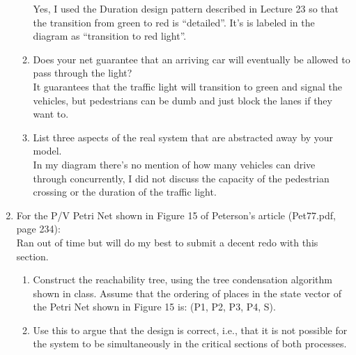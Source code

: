\documentclass{article}
\begin{document}
\begin{enumerate}
\begin{enumerate}
       Yes, I used the Duration design pattern described in Lecture 23 so that the transition from green to red is ``detailed''.
    It's is labeled in the diagram as ``transition to red light''.
  \item Does your net guarantee that an arriving car will eventually be allowed to pass through the light? \\
    It guarantees that the traffic light will transition to green and signal the vehicles, but pedestrians can be dumb and just block the lanes if they want to.
  \item List three aspects of the real system that are abstracted away by your model. \\
    In my diagram there's no mention of how many vehicles can drive through concurrently, I did not discuss the capacity of the pedestrian crossing or the duration of the traffic light. \\
    \end{enumerate}


\item For the P/V Petri Net shown in Figure 15 of Peterson's article
(Pet77.pdf, page 234):
\\ Ran out of time but will do my best to submit a decent redo with this section.
\begin{enumerate}
 \item  Construct the reachability tree, using the tree condensation
        algorithm shown in class. Assume that the ordering of places in the state vector of the Petri Net shown in Figure 15 is:
(P1, P2, P3, P4, S).


 \item Use this to argue that the design is correct, i.e., that it is
       not possible for the system to be simultaneously in the
       critical sections of both processes.
\end{enumerate}

\end{enumerate}
\end{document}
